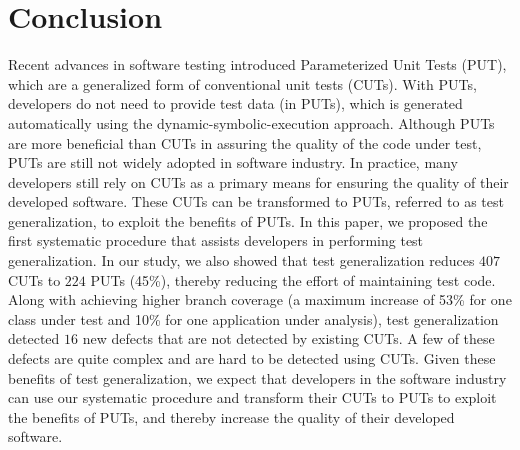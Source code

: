\section{Conclusion}
\label{sec:conclusion}

Recent advances in software testing introduced Parameterized Unit Tests (PUT), which are a generalized form of conventional unit tests (CUTs). With PUTs, developers do not need to provide test data (in PUTs), which is generated automatically using the dynamic-symbolic-execution approach. Although PUTs are more beneficial than CUTs in assuring the quality of the code under test, PUTs are still not widely adopted in software industry. In practice, many developers still rely on CUTs as a primary means for ensuring the quality of their developed software. These CUTs can be transformed to PUTs, referred to as test generalization, to exploit the benefits of PUTs. In this paper, we proposed the first systematic procedure that assists developers in performing test generalization. In our study, we also showed that test generalization reduces $407$ CUTs to $224$ PUTs (45\%), thereby reducing the effort of maintaining test code. Along with achieving higher branch coverage (a maximum increase of 53\% for one class under test and 10\% for one application under analysis), test generalization detected $16$ new defects that are not detected by existing CUTs. A few of these defects are quite complex and are hard to be detected using CUTs. Given these benefits of test generalization, we expect that developers in the software industry can use our systematic procedure and transform their CUTs to PUTs to exploit the benefits of PUTs, and thereby increase the quality of their developed software.

